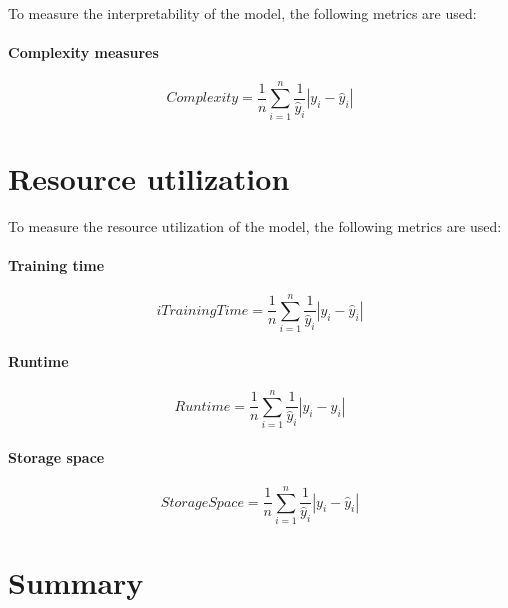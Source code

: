 To measure the interpretability of the model, the following metrics are used:

\paragraph*{Complexity measures}

\begin{equation}
    \label{eq:complexity}
    Complexity = \frac{1}{n} \sum_{i=1}^{n} \frac{1}{\hat{y}_i} |y_i - \hat{y}_i|
\end{equation}

\section{Resource utilization}

To measure the resource utilization of the model, the following metrics are used:

\paragraph*{Training time}

\begin{equation}i
    \label{eq:training_time}
    Training Time = \frac{1}{n} \sum_{i=1}^{n} \frac{1}{\hat{y}_i} |y_i - \hat{y}_i|
\end{equation}

\paragraph*{Runtime}

\begin{equation}
    \label{eq:runtime}
    Runtime = \frac{1}{n} \sum_{i=1}^{n} \frac{1}{\hat{y}_i} |y_i - \hat{y}_i|
\end{equation}

\paragraph*{Storage space}

\begin{equation}
    \label{eq:storage_space}
    Storage Space = \frac{1}{n} \sum_{i=1}^{n} \frac{1}{\hat{y}_i} |y_i - \hat{y}_i|
\end{equation}

\section{Summary}
